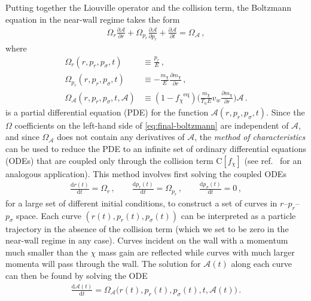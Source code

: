 \documentclass[
onecolumn, %
11pt, %
tightenlines,
superscriptaddress, %
nofootinbib, %
preprintnumbers, %
prd %
]{revtex4-1}
\newcommand{\pd}[2]{\frac{\partial #1}{\partial #2}}                  %
\newcommand{\td}[2]{\frac{\mathrm d #1}{\mathrm d #2}}                %
\newcommand{\f}{\ensuremath{f_\chi}\xspace}
\newcommand{\A}{\ensuremath{\mathcal A}\xspace}
\newcommand{\feq}{\ensuremath{\f^\text{eq}}\xspace}
\begin{document}
Putting together the Liouville operator and the collision term, the Boltzmann equation in the near-wall regime takes the form
%
\begin{align}
  \Omega_r\pd{\A}{r} + \Omega_{p_r}\pd{\A}{p_r} + \pd{\A}{t} = \Omega_\A\,,
  \label{eq:final-boltzmann}
\end{align}
%
where
%
\begin{align}
 \Omega_r(r,p_r, p_\sigma,t)     &\equiv   \frac{p_r}{E} \,,\\
%
 \Omega_{p_r}(r,p_r, p_\sigma,t) &\equiv -\frac{m_\chi}{E} \pd{m_\chi}{r} \,,\\
%
 \Omega_\A(r,p_r, p_\sigma,t,\A) &\equiv
    (1-\feq) \bigg(\frac{m_\chi}{T_n E}v_w\pd{m_\chi}{r} \bigg) \A \,.
\end{align}
%
 is a  partial differential equation (PDE) for the function $\A(r,p_r,p_\sigma,t)$.  Since the $\Omega$ coefficients on the left-hand side of \cref{eq:final-boltzmann} are independent of $\A$, and since $\Omega_{\A}$ does not contain any derivatives of $\A$, the \textit{method of characteristics} can be used to reduce the PDE to an infinite set of ordinary differential equations (ODEs) that are coupled only through the collision term $\boldsymbol{\mathrm C}[f_\chi]$ (see ref.~\cite{Baker:2019ndr} for an analogous application). This method involves first solving the coupled ODEs
%
\begin{align}
    \td{r(t)}{t} = \Omega_r \,,
    \qquad
    \td{p_r(t)}{t} = \Omega_{p_r} \,,
    \qquad
    \td{p_\sigma(t)}{t} = 0 \,,
    \label{eq:lagrange-charpit}
\end{align}
%
for a large set of different initial conditions, to construct a set of curves in $r$--$p_r$--$p_\sigma$ space. Each curve $(r(t), p_r(t), p_\sigma(t))$ can be interpreted as a particle trajectory in the absence of the collision term (which we set to be zero in the near-wall regime in any case).  Curves incident on the wall with a momentum much smaller than the $\chi$ mass gain are reflected while curves with much larger momenta will pass through the wall.  The solution for $\A(t)$ along each curve can then be found by solving the ODE
%
\begin{align}
    \label{eq:ode-1}
    \td{\A(t)}{t} = \Omega_\A\big(r(t),p_r(t), p_\sigma(t),t,\A(t) \big)\,.
\end{align}
\end{document}
